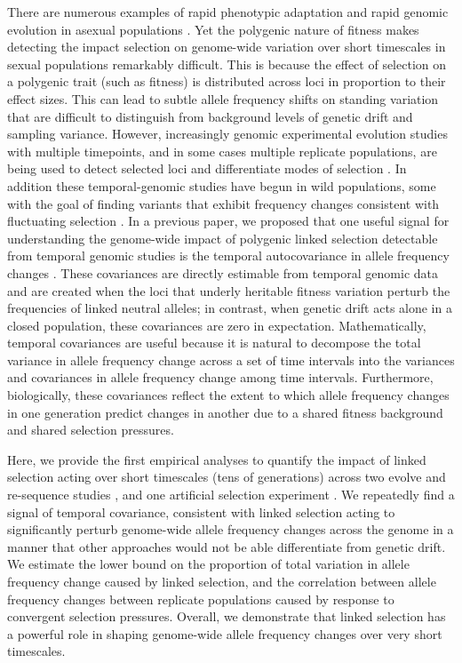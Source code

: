 \documentclass[11pt]{article}
\begin{document}
There are numerous examples of rapid phenotypic adaptation
\parencite{Grant2011-wk,Grant2006-hj,Reznick1997-mh,Franks2007-dr} and rapid
genomic evolution in asexual populations
\parencite{Good2017-om,Bennett1990-bc,Baym2016-kh}.  Yet the polygenic nature
of fitness makes detecting the impact selection on genome-wide variation over
short timescales in sexual populations remarkably difficult. This is because
the effect of selection on a polygenic trait (such as fitness) is distributed
across loci in proportion to their effect sizes. This can lead to subtle allele
frequency shifts on standing variation that are difficult to distinguish from
background levels of genetic drift and sampling variance.  However,
increasingly genomic experimental evolution studies with multiple timepoints,
and in some cases multiple replicate populations, are being used to detect
selected loci \parencite{Turner2011-sx,Turner2012-bm} and differentiate modes
of selection \parencite{Burke2010-tz,Barghi2019-qy,Therkildsen2019-zy}.  In
addition these temporal-genomic studies have begun in wild populations, some
with the goal of finding variants that exhibit frequency changes consistent
with fluctuating selection \parencite{Bergland2014-ij,Machado2018-cs}. In a
previous paper, we proposed that one useful signal for understanding the
genome-wide impact of polygenic linked selection detectable from temporal
genomic studies is the temporal autocovariance in allele frequency changes
\parencite{Buffalo2019-io}.  These covariances are directly estimable from
temporal genomic data and are created when the loci that underly heritable
fitness variation perturb the frequencies of linked neutral alleles; in
contrast, when genetic drift acts alone in a closed population, these
covariances are zero in expectation. Mathematically, temporal covariances are
useful because it is natural to decompose the total variance in allele
frequency change across a set of time intervals into the variances and
covariances in allele frequency change among time intervals. Furthermore,
biologically, these covariances reflect the extent to which allele frequency
changes in one generation predict changes in another due to a shared fitness
background and shared selection pressures.

Here, we provide the first empirical analyses to quantify the impact of linked
selection acting over short timescales (tens of generations) across two evolve
and re-sequence studies \parencite{Barghi2019-qy,Kelly2019-dc}, and one
artificial selection experiment \parencite{Castro2019-uk}. We repeatedly find a
signal of temporal covariance, consistent with linked selection acting to
significantly perturb genome-wide allele frequency changes across the genome in
a manner that other approaches would not be able differentiate from genetic
drift. We estimate the lower bound on the proportion of total variation in
allele frequency change caused by linked selection, and the correlation between
allele frequency changes between replicate populations caused by response to
convergent selection pressures. Overall, we demonstrate that linked selection
has a powerful role in shaping genome-wide allele frequency changes over very
short timescales.
\end{document}
